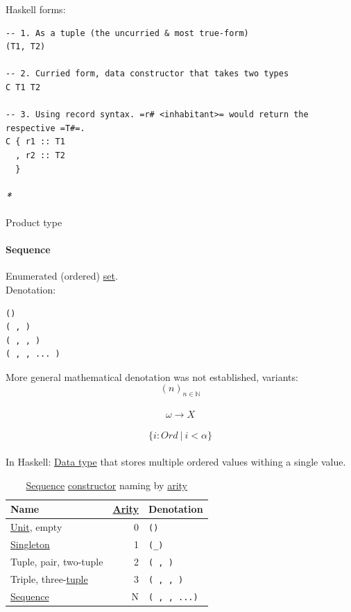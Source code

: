\documentclass[11pt]{article}
\begin{document}
Haskell forms:\\
\begin{verbatim}
-- 1. As a tuple (the uncurried & most true-form)
(T1, T2)

-- 2. Curried form, data constructor that takes two types
C T1 T2

-- 3. Using record syntax. =r# <inhabitant>= would return the respective =T#=.
C { r1 :: T1
  , r2 :: T2
  }
\end{verbatim}

\paragraph{\emph{*}}
\label{sec:orgd30e79b}

\label{orgb3527ef}Product type\\

\paragraph{\label{orgf90a45c}Sequence}
\label{sec:org3e5b49a}
Enumerated (ordered) \hyperref[orgbed80ba]{set}.\\

Denotation:\\
\begin{verbatim}
()
( , )
( , , )
( , , ... )
\end{verbatim}

More general mathematical denotation was not established, variants:\\
$$ (n)_{n \in \mathbb{N}} $$\\
$$ \omega \to X $$\\
$$ \{ i:Ord \ | \ i < \alpha \} $$\\

In Haskell: \hyperref[org965cde3]{Data type} that stores multiple ordered values withing a single value.\\

\begin{table}[htbp]
\caption{\label{tab:sequence-names}\hyperref[orgf90a45c]{Sequence} \hyperref[orgd019743]{constructor} naming by \hyperref[orgcb1a08f]{arity}}
\centering
\begin{tabular}{lrl}
Name & \hyperref[orgcb1a08f]{Arity} & Denotation\\
\hline
\hyperref[org2833f3f]{Unit}, empty & 0 & \texttt{()}\\
\hyperref[org2967024]{Singleton} & 1 & \texttt{(\_)}\\
\label{org7c37a79}Tuple, pair, \label{orge755866}two-tuple & 2 & \texttt{( , )}\\
\label{orgec62bd0}Triple, three-\hyperref[org7c37a79]{tuple} & 3 & \texttt{( , , )}\\
\hyperref[orgf90a45c]{Sequence} & N & \texttt{( , , ...)}\\
\end{tabular}
\end{table}
\end{document}
